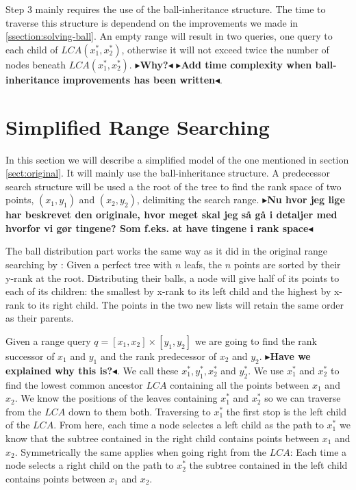 \documentclass[twoside,11pt,openright]{report}
\newcommand{\todo}[1]{{\color[rgb]{.5,0,0}\textbf{$\blacktriangleright$#1$\blacktriangleleft$}}}
\begin{document}
Step $3$ mainly requires the use of the ball-inheritance structure. The time to traverse this structure is dependend on the improvements we made in \ref{ssection:solving-ball}. An empty range will result in two queries, one query to each child of $LCA(x^*_1, x^*_2)$, otherwise it will not exceed twice the number of nodes beneath $LCA(x^*_1, x^*_2)$. \todo{Why?} \todo{Add time complexity when ball-inheritance improvements has been written}.

\section{Simplified Range Searching}

In this section we will describe a simplified model of the one mentioned in section \ref{sect:original}. It will mainly use the ball-inheritance structure. A predecessor search structure will be used a the root of the tree to find the rank space of two points, $(x_1,y_1)$ and $(x_2,y_2)$, delimiting the search range.
\todo{Nu hvor jeg lige har beskrevet den originale, hvor meget skal jeg så gå i detaljer med hvorfor vi gør tingene? Som f.eks. at have tingene i rank space}

The ball distribution part works the same way as it did in the original range searching by \citeauthor{chanetal}: Given a perfect tree with $n$ leafs, the $n$ points are sorted by their y-rank at the root. Distributing their balls, a node will give half of its points to each of its children: the smallest by x-rank to its left child and the highest by x-rank to its right child. The points in the two new lists will retain the same order as their parents.

Given a range query $q = [x_1, x_2] \times [y_1, y_2]$ we are going to find the rank successor of $x_1$ and $y_1$ and the rank predecessor of $x_2$ and $y_2$. \todo{Have we explained why this is?}. We call these $x^*_1, y^*_1, x^*_2$ and $y^*_2$. We use $x^*_1$ and $x^*_2$ to find the lowest common ancestor $LCA$ containing all the points between $x_1$ and $x_2$. We know the positions of the leaves containing $x^*_1$ and $x^*_2$ so we can traverse from the $LCA$ down to them both. Traversing to $x^*_1$ the first stop is the left child of the $LCA$. From here, each time a node selectes a left child as the path to $x^*_1$ we know that the subtree contained in the right child contains points between $x_1$ and $x_2$. Symmetrically the same applies when going right from the $LCA$: Each time a node selects a right child on the path to $x^*_2$ the subtree contained in the left child contains points between $x_1$ and $x_2$. 
\end{document}

